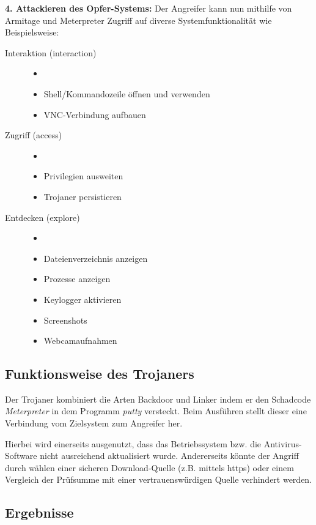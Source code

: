 \bigskip
\textbf{4. Attackieren des Opfer-Systems: }
Der Angreifer kann nun mithilfe von Armitage und Meterpreter Zugriff auf diverse Systemfunktionalität wie Beispielsweise:
\begin{description}
	\item[Interaktion (interaction)]
		\begin{itemize}
			\item[]  
			\item Shell/Kommandozeile öffnen und verwenden
			\item VNC-Verbindung aufbauen
		\end{itemize}
	\item[Zugriff (access)]
		\begin{itemize}
			\item[]
			\item Privilegien ausweiten
			\item Trojaner persistieren
		\end{itemize}
	\item[Entdecken (explore)]  
		\begin{itemize}
			\item[]  
			\item Dateienverzeichnis anzeigen
			\item Prozesse anzeigen
			\item Keylogger aktivieren
			\item Screenshots
			\item Webcamaufnahmen 
		\end{itemize}
\end{description}

\subsection{Funktionsweise des Trojaners}\label{sec:praktischeDurchfuehrung-funktionsweise}
Der Trojaner kombiniert die Arten Backdoor und Linker indem er den Schadcode \textit{Meterpreter} 
in dem Programm \textit{putty} versteckt.
Beim Ausführen stellt dieser eine Verbindung vom Zielsystem zum Angreifer her.

Hierbei wird einerseits ausgenutzt, dass das Betriebssystem bzw. die Antivirus-Software nicht ausreichend aktualisiert wurde.
Andererseits könnte der Angriff durch wählen einer sicheren Download-Quelle (z.B. mittels https)
oder einem Vergleich der Prüfsumme mit einer vertrauenswürdigen Quelle verhindert werden.

\subsection{Ergebnisse}\label{sec:praktischeDurchfuehrung-ergebnisse}

